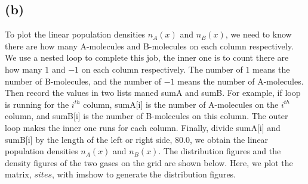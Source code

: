 \documentclass{article}
\begin{document}
\subsection{(b)}
To plot the linear population densities $n_{A}(x)$ and $n_{B}(x)$, we need
to know there are how many A-molecules and B-molecules on each column
respectively. We use a nested loop to complete this job, the inner one is to
count there are how many $1$ and $-1$ on each column respectively. The
number of $1$ means the number of B-molecules, and the number of $-1$ means
the number of A-molecules. Then record the values in two lists maned sumA
and sumB. For example, if loop is running for the $i^{th}$ column, sumA[i]
is the number of A-molecules on the $i^{th}$ column, and sumB[i] is the
number of B-molecules on this column. The outer loop makes the inner one
runs for each column. Finally, divide sumA[i] and sumB[i] by the length of
the left or right side, $80.0$, we obtain the linear population densities $%
n_{A}(x)$ and $n_{B}(x)$. The distribution figures and the density figures
of the two gases on the grid are shown below. Here, we plot the matrix, $%
sites$, with imshow to generate the distribution figures.
\begin{figure}[!ht]
	\centering
\end{figure}
\begin{figure}[!ht]
	\centering
\end{figure}
\end{document}
